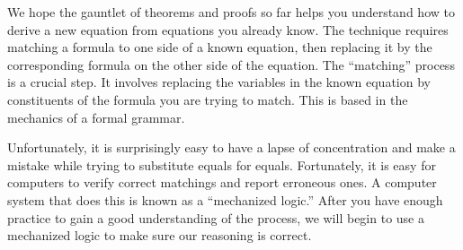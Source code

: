 We hope the gauntlet of theorems and proofs so far
helps you understand how to derive a new equation from equations you already know.
The technique requires matching a formula to one side of a known equation,
then replacing it by the corresponding formula on the other side
of the equation.
The
``matching'' process is a crucial step.
It involves replacing the variables in the known equation
by constituents of the formula you are trying to match.
This is based in the mechanics of a formal grammar.

Unfortunately, it is surprisingly easy
to have a lapse of concentration and make a mistake
while trying to substitute equals for equals.
Fortunately, it is easy for computers to verify
correct matchings and report erroneous ones.
A computer system that does this is known as a ``mechanized logic.''
After you have enough practice to gain a good understanding of the process,
we will begin to use a mechanized logic to make sure our reasoning is correct.

\begin{exercises}


\end{exercises}

